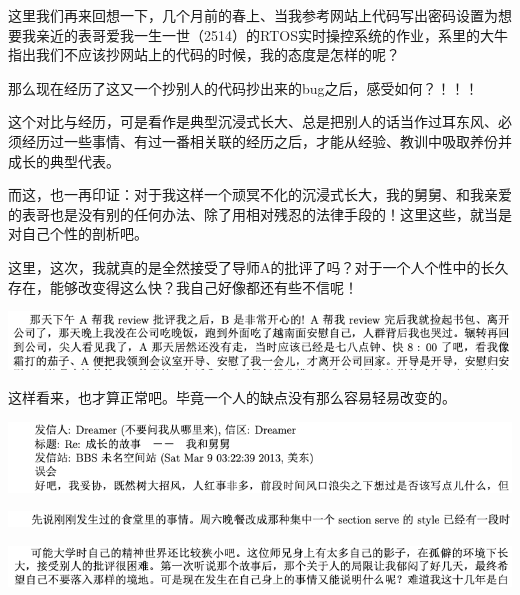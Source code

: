 \documentclass[9pt, b5paper]{article}
\begin{document}
这里我们再来回想一下，几个月前的春上、当我参考网站上代码写出密码设置为想要我亲近的表哥爱我一生一世（2514）的RTOS实时操控系统的作业，系里的大牛指出我们不应该抄网站上的代码的时候，我的态度是怎样的呢？

那么现在经历了这又一个抄别人的代码抄出来的bug之后，感受如何？！！！

这个对比与经历，可是看作是典型沉浸式长大、总是把别人的话当作过耳东风、必须经历过一些事情、有过一番相关联的经历之后，才能从经验、教训中吸取养份并成长的典型代表。

而这，也一再印证：对于我这样一个顽冥不化的沉浸式长大，我的舅舅、和我亲爱的表哥也是没有别的任何办法、除了用相对残忍的法律手段的！这里这些，就当是对自己个性的剖析吧。 

这里，这次，我就真的是全然接受了导师A的批评了吗？对于一个人个性中的长久存在，能够改变得这么快？我自己好像都还有些不信呢！

\begin{center}
\includegraphics[width=.9\linewidth]{./pic/backups_plans_20210512_104720.png}
\end{center}

这样看来，也才算正常吧。毕竟一个人的缺点没有那么容易轻易改变的。 

\begin{center}
\includegraphics[width=.9\linewidth]{./pic/backups_plans_20210512_105001.png}
\end{center}

\begin{center}
\includegraphics[width=.9\linewidth]{./pic/backups_plans_20210512_105033.png}
\end{center}

\begin{center}
\includegraphics[width=.9\linewidth]{./pic/backups_plans_20210512_105046.png}
\end{center}
\end{document}
